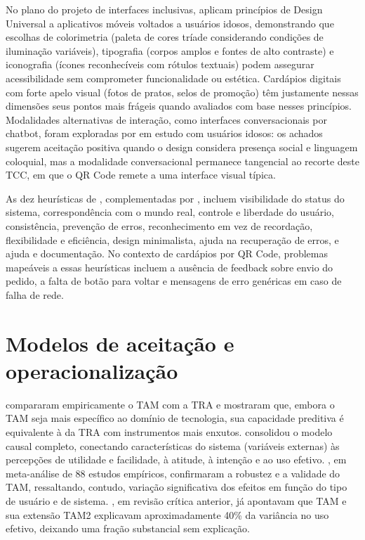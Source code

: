 No plano do projeto de interfaces inclusivas,  aplicam princípios de Design Universal \cite{mace1997principles} a aplicativos móveis voltados a usuários idosos, demonstrando que escolhas de colorimetria (paleta de cores tríade considerando condições de iluminação variáveis), tipografia (corpos amplos e fontes de alto contraste) e iconografia (ícones reconhecíveis com rótulos textuais) podem assegurar acessibilidade sem comprometer funcionalidade ou estética. Cardápios digitais com forte apelo visual (fotos de pratos, selos de promoção) têm justamente nessas dimensões seus pontos mais frágeis quando avaliados com base nesses princípios. Modalidades alternativas de interação, como interfaces conversacionais por chatbot, foram exploradas por  em estudo com usuários idosos: os achados sugerem aceitação positiva quando o design considera presença social e linguagem coloquial, mas a modalidade conversacional permanece tangencial ao recorte deste TCC, em que o QR Code remete a uma interface visual típica.

As dez heurísticas de , complementadas por , incluem visibilidade do status do sistema, correspondência com o mundo real, controle e liberdade do usuário, consistência, prevenção de erros, reconhecimento em vez de recordação, flexibilidade e eficiência, design minimalista, ajuda na recuperação de erros, e ajuda e documentação. No contexto de cardápios por QR Code, problemas mapeáveis a essas heurísticas incluem a ausência de feedback sobre envio do pedido, a falta de botão para voltar e mensagens de erro genéricas em caso de falha de rede.

\section{Modelos de aceitação e operacionalização}

 compararam empiricamente o TAM com a TRA e mostraram que, embora o TAM seja mais específico ao domínio de tecnologia, sua capacidade preditiva é equivalente à da TRA com instrumentos mais enxutos.  consolidou o modelo causal completo, conectando características do sistema (variáveis externas) às percepções de utilidade e facilidade, à atitude, à intenção e ao uso efetivo. , em meta-análise de 88 estudos empíricos, confirmaram a robustez e a validade do TAM, ressaltando, contudo, variação significativa dos efeitos em função do tipo de usuário e de sistema. , em revisão crítica anterior, já apontavam que TAM e sua extensão TAM2 explicavam aproximadamente 40\% da variância no uso efetivo, deixando uma fração substancial sem explicação.

